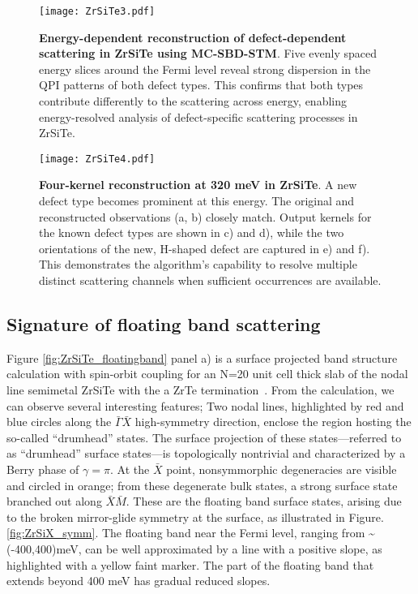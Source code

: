 \begin{figure}
	\texttt{[image: ZrSiTe3.pdf]} 
	\centering
	\caption[\textbf{Energy-dependent reconstruction of defect-dependent scattering in ZrSiTe using MC-SBD-STM}]{\textbf{Energy-dependent reconstruction of defect-dependent scattering in ZrSiTe using MC-SBD-STM}. Five evenly spaced energy slices around the Fermi level reveal strong dispersion in the QPI patterns of both defect types. This confirms that both types contribute differently to the scattering across energy, enabling energy-resolved analysis of defect-specific scattering processes in ZrSiTe.}
	\label{fig:ZrSiTe3}
\end{figure}

\begin{figure}
	\texttt{[image: ZrSiTe4.pdf]} 
	\centering
	\caption[\textbf{Four-kernel reconstruction at 320 meV in ZrSiTe}]{\textbf{Four-kernel reconstruction at 320 meV in ZrSiTe}. A new defect type becomes prominent at this energy. The original and reconstructed observations (a, b) closely match. Output kernels for the known defect types are shown in c) and d), while the two orientations of the new, H-shaped defect are captured in e) and f). This demonstrates the algorithm’s capability to resolve multiple distinct scattering channels when sufficient occurrences are available.}
	\label{fig:ZrSiTe4}
\end{figure}

\subsection{Signature of floating band scattering}
Figure \ref{fig:ZrSiTe_floatingband} panel a) is a surface projected band structure calculation with spin-orbit coupling for an N=20 unit cell thick slab of the nodal line semimetal ZrSiTe with the a ZrTe termination~\cite{stuartQuasiparticleInterferenceObservation2022}. From the calculation, we can observe several interesting features; Two nodal lines, highlighted by red and blue circles along the $\bar{\Gamma}\bar{X}$ high-symmetry direction, enclose the region hosting the so-called “drumhead” states. The surface projection of these states—referred to as “drumhead” surface states—is topologically nontrivial and characterized by a Berry phase of $\gamma = \pi$. At the $\bar{X}$ point, nonsymmorphic degeneracies are visible and circled in orange; from these degenerate bulk states, a strong surface state branched out along $\bar{X}\bar{M}$. These are the floating band surface states, arising due to the broken mirror-glide symmetry at the surface, as illustrated in Figure. \ref{fig:ZrSiX_symm}. The floating band near the Fermi level, ranging from \textasciitilde (-400,400)meV, can be well approximated by a line with a positive slope, as highlighted with a yellow faint marker. The part of the floating band that extends beyond 400 meV has gradual reduced slopes. 


